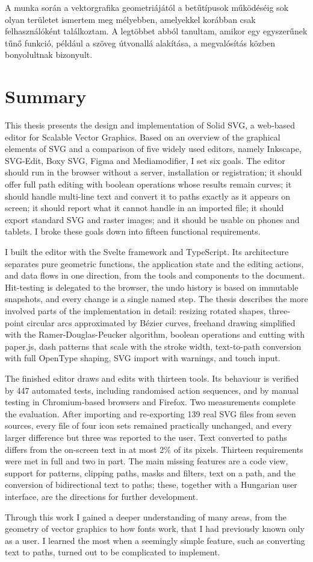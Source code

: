 A munka során a vektorgrafika geometriájától a betűtípusok működéséig sok olyan területet ismertem meg mélyebben, amelyekkel korábban csak felhasználóként találkoztam. A legtöbbet abból tanultam, amikor egy egyszerűnek tűnő funkció, például a szöveg útvonallá alakítása, a megvalósítás közben bonyolultnak bizonyult.


\chapter*{Summary}
\label{ch:summary_en}

This thesis presents the design and implementation of Solid SVG, a web-based editor for Scalable Vector Graphics. Based on an overview of the graphical elements of SVG and a comparison of five widely used editors, namely Inkscape, SVG-Edit, Boxy SVG, Figma and Mediamodifier, I set six goals. The editor should run in the browser without a server, installation or registration; it should offer full path editing with boolean operations whose results remain curves; it should handle multi-line text and convert it to paths exactly as it appears on screen; it should report what it cannot handle in an imported file; it should export standard SVG and raster images; and it should be usable on phones and tablets. I broke these goals down into fifteen functional requirements.

I built the editor with the Svelte framework and TypeScript. Its architecture separates pure geometric functions, the application state and the editing actions, and data flows in one direction, from the tools and components to the document. Hit-testing is delegated to the browser, the undo history is based on immutable snapshots, and every change is a single named step. The thesis describes the more involved parts of the implementation in detail: resizing rotated shapes, three-point circular arcs approximated by Bézier curves, freehand drawing simplified with the Ramer-Douglas-Peucker algorithm, boolean operations and cutting with paper.js, dash patterns that scale with the stroke width, text-to-path conversion with full OpenType shaping, SVG import with warnings, and touch input.

The finished editor draws and edits with thirteen tools. Its behaviour is verified by 447 automated tests, including randomised action sequences, and by manual testing in Chromium-based browsers and Firefox. Two measurements complete the evaluation. After importing and re-exporting 139 real SVG files from seven sources, every file of four icon sets remained practically unchanged, and every larger difference but three was reported to the user. Text converted to paths differs from the on-screen text in at most 2\% of its pixels. Thirteen requirements were met in full and two in part. The main missing features are a code view, support for patterns, clipping paths, masks and filters, text on a path, and the conversion of bidirectional text to paths; these, together with a Hungarian user interface, are the directions for further development.

Through this work I gained a deeper understanding of many areas, from the geometry of vector graphics to how fonts work, that I had previously known only as a user. I learned the most when a seemingly simple feature, such as converting text to paths, turned out to be complicated to implement.